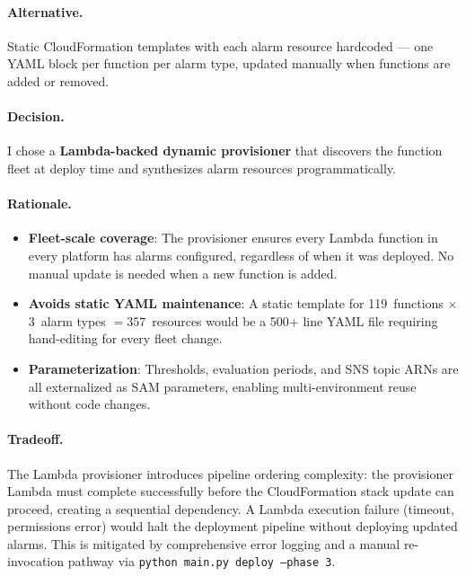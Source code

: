 \paragraph{Alternative.}
Static CloudFormation templates with each alarm resource hardcoded ---
one YAML block per function per alarm type, updated manually when
functions are added or removed.

\paragraph{Decision.}
I chose a \textbf{Lambda-backed dynamic provisioner} that discovers the function
fleet at deploy time and synthesizes alarm resources programmatically.

\paragraph{Rationale.}

\begin{itemize}
    \item \textbf{Fleet-scale coverage}: The provisioner ensures every
          Lambda function in every platform has alarms
          configured, regardless of when it was deployed. No manual
          update is needed when a new function is added.

    \item \textbf{Avoids static YAML maintenance}: A static template
          for 119~functions $\times$ 3~alarm types $= 357$~resources
          would be a 500+ line YAML file requiring hand-editing for
          every fleet change.

    \item \textbf{Parameterization}: Thresholds, evaluation periods,
          and SNS topic ARNs are all externalized as SAM parameters,
          enabling multi-environment reuse without code changes.
\end{itemize}

\paragraph{Tradeoff.}
The Lambda provisioner introduces pipeline ordering complexity: the
provisioner Lambda must complete successfully before the CloudFormation
stack update can proceed, creating a sequential dependency. A Lambda
execution failure (timeout, permissions error) would halt the deployment
pipeline without deploying updated alarms. This is mitigated by
comprehensive error logging and a manual re-invocation pathway via
\texttt{python main.py deploy --phase 3}.

